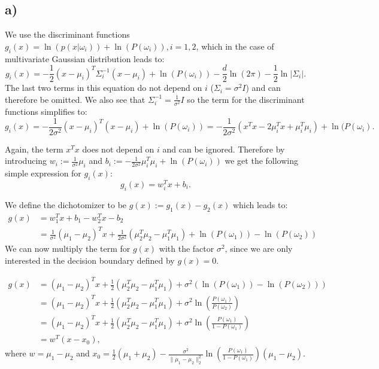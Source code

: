 \documentclass[paper=a4,fontsize=10pt,DIV11,BCOR10mm]{scrartcl}
\begin{document}
\subsection*{a)}
We use the discriminant functions $g_i(x)=\ln (p(x|\omega_i))+\ln(P(\omega_i)), i=1,2$, which in the case of multivariate Gaussian distribution leads to:
\begin{equation*}
g_i(x)= -\frac{1}{2}(x-\mu_i)^T\Sigma_i^{-1}(x-\mu_i)+ \ln(P(\omega_i)) -\frac{d}{2} \ln(2 \pi)-\frac{1}{2}\ln \lvert\Sigma_i\rvert\text{.}
\end{equation*}
The last two terms in this equation do not depend on $i$ ($\Sigma_i=\sigma^2I$) and can therefore be omitted. We also see that $\Sigma_i ^{-1}=\frac{1}{\sigma^2}I$ so the term for the discriminant functions simplifies to:
\begin{equation*}
g_i(x)= -\frac{1}{2 \sigma^2}(x-\mu_i)^T(x-\mu_i)+ \ln(P(\omega_i))=-\frac{1}{2 \sigma^2}(x^Tx-2\mu_i^T x +\mu_i^T \mu_i)+ \ln(P(\omega_i)\text{.}
\end{equation*}

Again, the term $x^Tx$ does not depend on $i$ and can be ignored. Therefore by introducing $w_i:=\frac{1}{\sigma^2}\mu_i$ and $b_i:=-\frac{1}{2 \sigma^2}\mu_i^T\mu_i + \ln(P(\omega_i))$ we get the following simple expression for $g_i(x)$:
\begin{equation*}
g_i(x)=w_i^Tx+b_i\text{.}
\end{equation*}

We define the dichotomizer to be $g(x):=g_1(x)-g_2(x)$ which leads to:
\begin{align*}
g(x)&=w_1^Tx+b_1-w_2^Tx-b_2\\
&=\frac{1}{\sigma^2}(\mu_1-\mu_2)^Tx+\frac{1}{2 \sigma^2}(\mu_2^T\mu_2 -\mu_1^T\mu_1)+ \ln(P(\omega_1))- \ln(P(\omega_2))
\end{align*}
 We can now multiply the term for $g(x)$ with the factor $\sigma^2$, since we are only interested in the decision boundary defined by $g(x)=0$.

\begin{align*}
g(x)&=(\mu_1-\mu_2)^Tx + \frac{1}{2}(\mu_2^T\mu_2 -\mu_1^T\mu_1)+ \sigma^2(\ln(P(\omega_1))- \ln(P(\omega_2))) \\
&= (\mu_1-\mu_2)^Tx +\frac{1}{2}(\mu_2^T\mu_2 -\mu_1^T\mu_1)+ \sigma^2\ln(\frac{P(\omega_1)}{P(\omega_2)})\\
&=(\mu_1-\mu_2)^Tx +\frac{1}{2}(\mu_2^T\mu_2 -\mu_1^T\mu_1)+ \sigma^2\ln(\frac{P(\omega_1)}{1-P(\omega_1)})\\
&= w^T(x-x_0)\text{,}
\end{align*}
where $w=\mu_1-\mu_2$ and $x_0=\frac{1}{2}(\mu_1+\mu_2)-\frac{\sigma^2}{\lVert \mu_1 - \mu_2\rVert_2^2}\ln(\frac{P(\omega_1)}{1-P(\omega_1)})(\mu_1-\mu_2)$.
\end{document}
